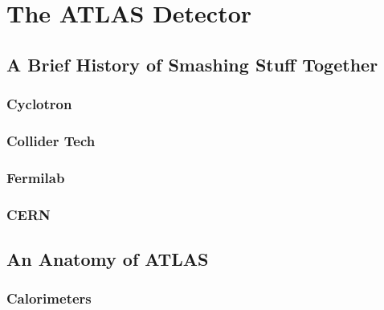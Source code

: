\chapter{The ATLAS Detector}

\section{A Brief History of Smashing Stuff Together}

\subsection{Cyclotron}

\subsection{Collider Tech}

\subsection{Fermilab}

\subsection{CERN}

\section{An Anatomy of ATLAS}

\subsection{Calorimeters}
